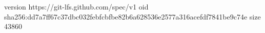version https://git-lfs.github.com/spec/v1
oid sha256:dd7a7ff67c37dbc032febfcbfbe82b6a628536e2577a316acefdf7841be9c74e
size 43860
